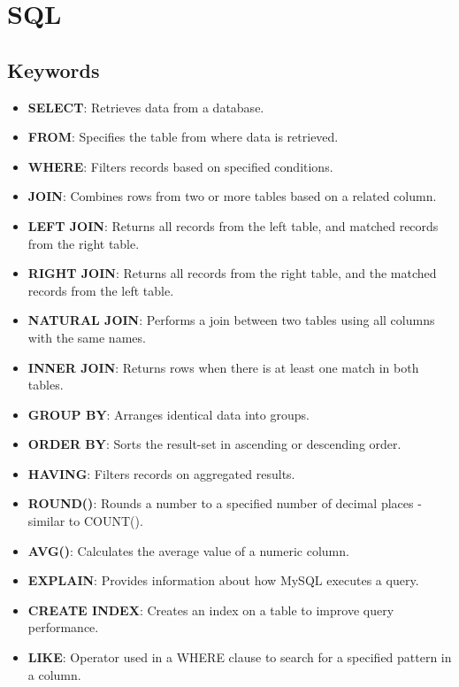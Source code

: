 \section*{SQL}

\subsection*{Keywords}

\begin{itemize}[noitemsep,leftmargin=*]
    \leftskip-\dimexpr\leftmargin %
    \item[]{\textbf{SELECT}: Retrieves data from a database.}
    \item[]{\textbf{FROM}: Specifies the table from where data is retrieved.}
    \item[]{\textbf{WHERE}: Filters records based on specified conditions.}
    \item[]{\textbf{JOIN}: Combines rows from two or more tables based on a related column.}
    \item[]{\textbf{LEFT JOIN}: Returns all records from the left table, and matched records from the right table.}
    \item[]{\textbf{RIGHT JOIN}: Returns all records from the right table, and the matched records from the left table.}
    \item[]{\textbf{NATURAL JOIN}: Performs a join between two tables using all columns with the same names.}
    \item[]{\textbf{INNER JOIN}: Returns rows when there is at least one match in both tables.}
    \item[]{\textbf{GROUP BY}: Arranges identical data into groups.}
    \item[]{\textbf{ORDER BY}: Sorts the result-set in ascending or descending order.}
    \item[]{\textbf{HAVING}: Filters records on aggregated results.}
    \item[]{\textbf{ROUND()}: Rounds a number to a specified number of decimal places - similar to COUNT().}
    \item[]{\textbf{AVG()}: Calculates the average value of a numeric column.}
    \item[]{\textbf{EXPLAIN}: Provides information about how MySQL executes a query.}
    \item[]{\textbf{CREATE INDEX}: Creates an index on a table to improve query performance.}
    \item[]{\textbf{LIKE}: Operator used in a WHERE clause to search for a specified pattern in a column.}

\end{itemize}
